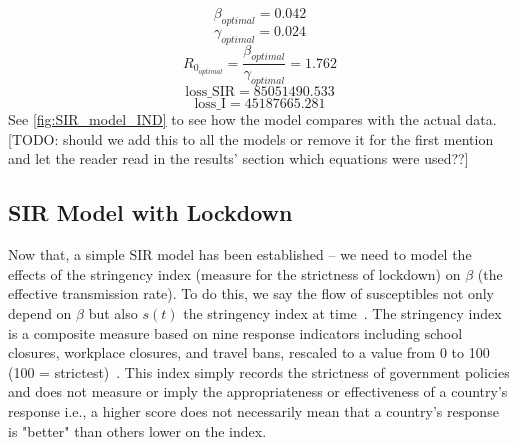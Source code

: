 \documentclass[tikz,fleqn,12pt]{wlscirep}
\begin{document}
\begin{equation}
  \beta_{optimal} = 0.042
  \label{eq:beta_optimal_without_lockdown}
\end{equation}
\begin{equation}
  \gamma_{optimal} = 0.024
  \label{eq:gamma_optimal_without_lockdown}
\end{equation}
\begin{equation}
  R_{0_{optimal}} = \frac{\beta_{optimal}}{\gamma_{optimal}} = 1.762
  \label{eq:r0_without_lockdown}
\end{equation}
\begin{equation}
  \textrm{loss\_SIR} = 85051490.533
  \label{eq:cost_SIR_without_lockdown}
\end{equation}
\begin{equation}
  \textrm{loss\_I} = 45187665.281
  \label{eq:cost_I_without_lockdown}
\end{equation}
See \cref{fig:SIR_model_IND} to see how the model compares with the actual data. [TODO: should we add this to all the models or remove it for the first mention and let the reader read in the results' section which equations were used??]

\subsection{SIR Model with Lockdown}
Now that, a simple SIR model has been established -- we need to model the effects of the stringency index (measure for the strictness of lockdown) on $\beta$ (the effective transmission rate). To do this, we say the flow of susceptibles not only depend on $\beta$ but also $s(t)$ the stringency index at time~\cite{NBERw26867,AlvarezLockdownSIR,SIRLockdown,SIRLockdown2,analytical_covid_lockdown_model}. The stringency index is a composite measure based on nine response indicators including school closures, workplace closures, and travel bans, rescaled to a value from 0 to 100 (100 = strictest)~\cite{owidcoronavirus}. This index simply records the strictness of government policies and does not measure or imply the appropriateness or effectiveness of a country's response i.e., a higher score does not necessarily mean that a country's response is "better" than others lower on the index.
\end{document}

